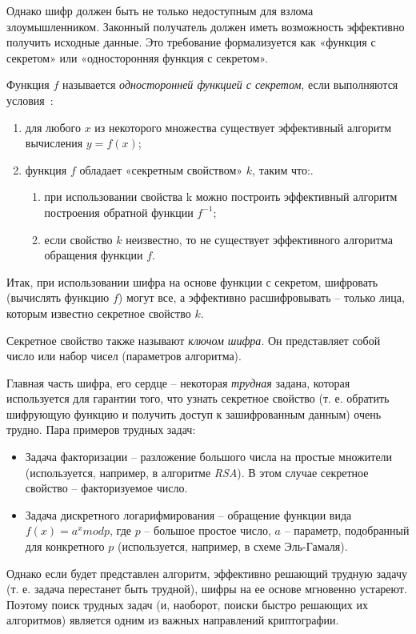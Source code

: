 Однако шифр должен быть не только недоступным для взлома злоумышленником. Законный получатель должен иметь возможность эффективно получить исходные данные. Это требование формализуется как «функция с секретом» или «односторонняя функция с секретом».

Функция $f$ называется \textit{односторонней функцией с секретом}, если выполняются условия~\cite{src12}:
\begin{enumerate}
	\item для любого $x$ из некоторого множества существует эффективный алгоритм вычисления $y=f(x)$;
	\item функция $f$ обладает «секретным свойством» $k$, таким что:.
	\begin{enumerate}
		\item при использовании свойства k можно построить эффективный алгоритм построения обратной функции $f^{-1}$;
		\item если свойство $k$ неизвестно, то не существует эффективного алгоритма обращения функции $f$.
	\end{enumerate}
\end{enumerate}

Итак, при использовании шифра на основе функции с секретом, шифровать (вычислять функцию $f$) могут все, а эффективно расшифровывать – только лица, которым известно секретное свойство $k$.

Секретное свойство также называют \textit{ключом шифра}. Он представляет собой число или набор чисел (параметров алгоритма).

Главная часть шифра, его сердце – некоторая \textit{трудная} задана, которая используется для гарантии того, что узнать секретное свойство (т. е. обратить шифрующую функцию и получить доступ к зашифрованным данным) очень трудно. Пара примеров трудных задач:
\begin{itemize}
	\item Задача факторизации – разложение большого числа на простые множители (используется, например, в алгоритме \textit{RSA}). В этом случае секретное свойство – факторизуемое число.
	\item Задача дискретного логарифмирования – обращение функции вида $f(x)=a^x mod p$, где $p$ – большое простое число, $a$ – параметр, подобранный для конкретного $p$ (используется, например, в схеме Эль-Гамаля).
\end{itemize}

Однако если будет представлен алгоритм, эффективно решающий трудную задачу (т. е. задача перестанет быть трудной), шифры на ее основе мгновенно устареют. Поэтому поиск трудных задач (и, наоборот, поиски быстро решающих их алгоритмов) является одним из важных направлений криптографии.

